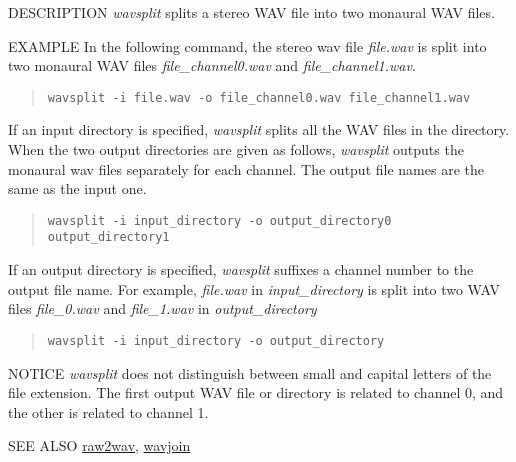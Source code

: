 \begin{synopsis}
\item[wavsplit] [ --i $I$ ][ --o $O$ ] 
\end{synopsis}

\begin{qsection}{DESCRIPTION}
{\em wavsplit} splits a stereo WAV file into two monaural WAV files.

\end{qsection}

\begin{options}
\end{options}

\begin{qsection}{EXAMPLE}
 In the following command, the stereo wav file {\em file.wav} is split into
 two monaural WAV files {\em file\_channel0.wav} and {\em file\_channel1.wav}.
\begin{quote}
 \verb!wavsplit -i file.wav -o file_channel0.wav file_channel1.wav!
\end{quote}
 If an input directory is specified, {\em wavsplit} splits all the WAV files in the directory.
 When the two output directories are given as follows, {\em wavsplit} outputs the monaural wav files separately for each channel.
 The output file names are the same as the input one.
 \begin{quote}
  \verb!wavsplit -i input_directory -o output_directory0 output_directory1!
 \end{quote}
 If an output directory is specified, {\em wavsplit} suffixes a channel number to the output file name.
 For example, {\em file.wav} in {\em input\_directory} is split into two WAV files {\em file\_0.wav} and {\em file\_1.wav} in {\em output\_directory}
\begin{quote}
  \verb!wavsplit -i input_directory -o output_directory!
\end{quote}
\end{qsection}

\begin{qsection}{NOTICE}
 {\em wavsplit} does not distinguish between small and capital letters of the file extension.
 The first output WAV file or directory is related to channel 0, and the other is related to channel 1.
\end{qsection}

\begin{qsection}{SEE ALSO}
\hyperlink{raw2wav}{raw2wav},
\hyperlink{wavjoin}{wavjoin}
\end{qsection}
